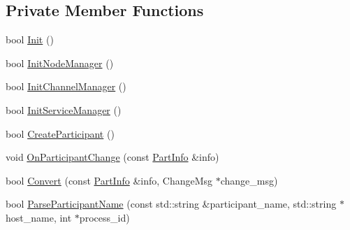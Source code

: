 \subsection*{Private Member Functions}
\begin{DoxyCompactItemize}
\item 
bool \hyperlink{classapollo_1_1cyber_1_1service__discovery_1_1TopologyManager_a885ec7c446c523cdceb0c7e798741131}{Init} ()
\item 
bool \hyperlink{classapollo_1_1cyber_1_1service__discovery_1_1TopologyManager_a216abf40b6b6716c940bd91ae7c23688}{Init\-Node\-Manager} ()
\item 
bool \hyperlink{classapollo_1_1cyber_1_1service__discovery_1_1TopologyManager_a15e2df0ff19069acc674c47a7a04cfcf}{Init\-Channel\-Manager} ()
\item 
bool \hyperlink{classapollo_1_1cyber_1_1service__discovery_1_1TopologyManager_a5c57484d3ea7174ca98120799293e045}{Init\-Service\-Manager} ()
\item 
bool \hyperlink{classapollo_1_1cyber_1_1service__discovery_1_1TopologyManager_aa3c636e9eb33231d29bd938aa694407a}{Create\-Participant} ()
\item 
void \hyperlink{classapollo_1_1cyber_1_1service__discovery_1_1TopologyManager_aa2ef6e89d81cf8650d7d4a680eb79fab}{On\-Participant\-Change} (const \hyperlink{classapollo_1_1cyber_1_1service__discovery_1_1TopologyManager_aa25acdf39ae101851911d7562d332cdf}{Part\-Info} \&info)
\item 
bool \hyperlink{classapollo_1_1cyber_1_1service__discovery_1_1TopologyManager_a114ead053c70644fdcec30729c466f80}{Convert} (const \hyperlink{classapollo_1_1cyber_1_1service__discovery_1_1TopologyManager_aa25acdf39ae101851911d7562d332cdf}{Part\-Info} \&info, Change\-Msg $\ast$change\-\_\-msg)
\item 
bool \hyperlink{classapollo_1_1cyber_1_1service__discovery_1_1TopologyManager_a6e55fb327092fe74b4a48573a9231951}{Parse\-Participant\-Name} (const std\-::string \&participant\-\_\-name, std\-::string $\ast$host\-\_\-name, int $\ast$process\-\_\-id)
\end{DoxyCompactItemize}
